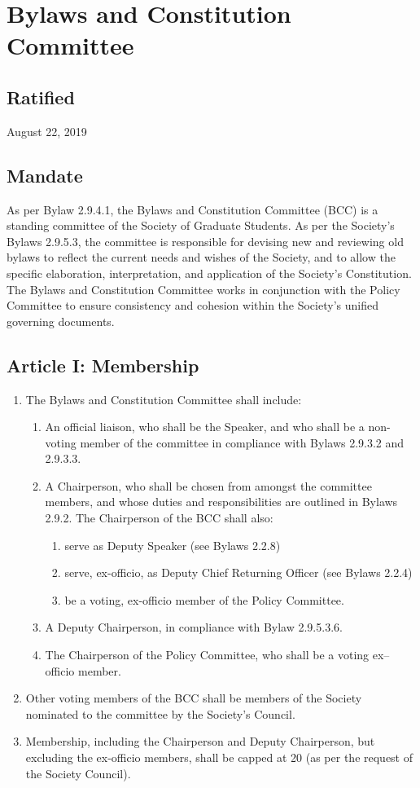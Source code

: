 \section{Bylaws and Constitution Committee}

\subsection{Ratified}
August 22, 2019

\subsection{Mandate}
As per Bylaw 2.9.4.1, the Bylaws and Constitution Committee (BCC) is a standing committee of the Society of Graduate Students. As per the Society's Bylaws 2.9.5.3, the committee is responsible for devising new and reviewing old bylaws to reflect the current needs and wishes of the Society, and to allow the specific elaboration, interpretation, and application of the Society's Constitution. The Bylaws and Constitution Committee works in conjunction with the Policy Committee to ensure consistency and cohesion within the Society's unified governing documents.

\subsection{Article I: Membership}
\begin{enumerate}[label*=\arabic*., align=left]	
\item The Bylaws and Constitution Committee shall include:
\begin{enumerate}[label*=\arabic*., align=left]	
\item An official liaison, who shall be the Speaker, and who shall be a non-voting member of the committee in compliance with Bylaws 2.9.3.2 and 2.9.3.3.
\item A Chairperson, who shall be chosen from amongst the committee members, and whose duties and responsibilities are outlined in Bylaws 2.9.2. The Chairperson of the BCC shall also:
\begin{enumerate}
\item serve as Deputy Speaker (see Bylaws 2.2.8)
\item serve, ex-officio, as Deputy Chief Returning Officer (see Bylaws 2.2.4)
\item be a voting, ex-officio member of the Policy Committee.
\end{enumerate}
\item A Deputy Chairperson, in compliance with Bylaw 2.9.5.3.6.
\item The Chairperson of the Policy Committee, who shall be a voting ex–officio member.
\end{enumerate}
\item Other voting members of the BCC shall be members of the Society nominated to the committee by the Society's Council.
\item Membership, including the Chairperson and Deputy Chairperson, but excluding the ex-officio members, shall be capped at 20 (as per the request of the Society Council).
\end{enumerate}

